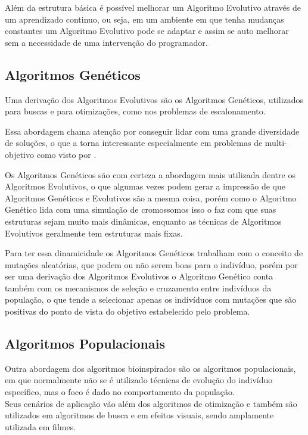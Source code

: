         Além da estrutura básica é possível melhorar um Algoritmo Evolutivo através de um aprendizado continuo, ou seja, em um ambiente em que tenha mudanças constantes um Algoritmo Evolutivo pode se adaptar e assim se auto melhorar sem a necessidade de uma intervenção do programador.


    \subsection{Algoritmos Genéticos}
        Uma derivação dos Algoritmos Evolutivos são os Algoritmos Genéticos, utilizados para buscas e para otimizações, como nos problemas de escalonamento.\breakline
        
        Essa abordagem chama atenção por conseguir lidar com uma grande diversidade de soluções, o que a torna interessante especialmente em problemas de multi-objetivo como visto por \cite{Bagchi1999}.\hfill\vspace{\onelineskip}
        
        Os Algoritmos Genéticos são com certeza a abordagem mais utilizada dentre os Algoritmos Evolutivos, o que algumas vezes podem gerar a impressão de que Algoritmos Genéticos e Evolutivos são a mesma coisa, porém como o Algoritmo Genético lida com uma simulação de cromossomos isso o faz com que suas estruturas sejam muito mais dinâmicas, enquanto as técnicas de Algoritmos Evolutivos geralmente tem estruturas mais fixas.\breakline
        
        Para ter essa dinamicidade os Algoritmos Genéticos trabalham com o conceito de mutações aleatórias, que podem ou não serem boas para o indivíduo, porém por ser uma derivação dos Algoritmos Evolutivos o Algoritmo Genético conta também com os mecanismos de seleção e cruzamento entre indivíduos da população, o que tende a selecionar apenas os indivíduos com mutações que são positivas do ponto de vista do objetivo estabelecido pelo problema.


    \subsection{Algoritmos Populacionais}
        Outra abordagem dos algoritmos bioinspirados são os algoritmos populacionais, em que normalmente não se é utilizado técnicas de evolução do indivíduo específico, mas o foco é dado no comportamento da população.\hfill
        \\
        Seus cenários de aplicação vão além dos algoritmos de otimização e também são utilizados em algoritmos de busca e em efeitos visuais, sendo amplamente utilizada em filmes.\hfill\vspace{\onelineskip}
        
